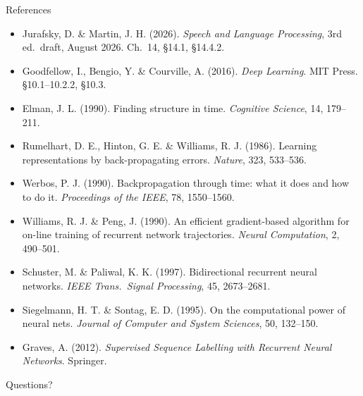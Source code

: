 \documentclass[aspectratio=169, 11pt]{beamer}
\begin{document}
\begin{frame}[allowframebreaks]{References}
  {\scriptsize
  \begin{itemize}\itemsep0.3em
    \item Jurafsky, D. \& Martin, J. H. (2026). \emph{Speech and Language
          Processing}, 3rd ed.\ draft, August 2026. Ch.~14, \S14.1, \S14.4.2.
    \item Goodfellow, I., Bengio, Y. \& Courville, A. (2016). \emph{Deep
          Learning}. MIT Press. \S10.1--10.2.2, \S10.3.
    \item Elman, J. L. (1990). Finding structure in time. \emph{Cognitive
          Science}, 14, 179--211.
    \item Rumelhart, D. E., Hinton, G. E. \& Williams, R. J. (1986). Learning
          representations by back-propagating errors. \emph{Nature}, 323,
          533--536.
    \item Werbos, P. J. (1990). Backpropagation through time: what it does
          and how to do it. \emph{Proceedings of the IEEE}, 78, 1550--1560.
    \item Williams, R. J. \& Peng, J. (1990). An efficient gradient-based
          algorithm for on-line training of recurrent network trajectories.
          \emph{Neural Computation}, 2, 490--501.
    \item Schuster, M. \& Paliwal, K. K. (1997). Bidirectional recurrent
          neural networks. \emph{IEEE Trans.\ Signal Processing}, 45,
          2673--2681.
    \item Siegelmann, H. T. \& Sontag, E. D. (1995). On the computational
          power of neural nets. \emph{Journal of Computer and System
          Sciences}, 50, 132--150.
    \item Graves, A. (2012). \emph{Supervised Sequence Labelling with
          Recurrent Neural Networks}. Springer.
  \end{itemize}}
\end{frame}

\begin{frame}[standout]
  Questions?
\end{frame}
\end{document}
